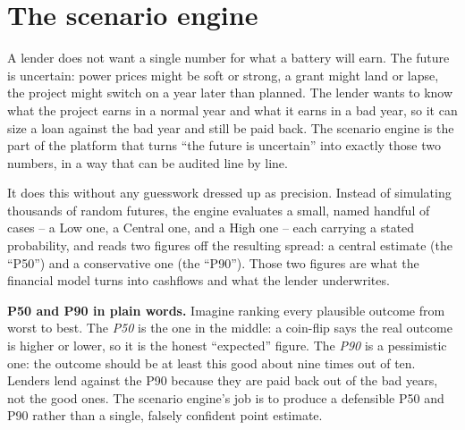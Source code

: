 \chapter{The scenario engine}
\label{ch:scenarios}

A lender does not want a single number for what a battery will earn. The future is uncertain: power prices might be soft or strong, a grant might land or lapse, the project might switch on a year later than planned. The lender wants to know what the project earns in a normal year and what it earns in a bad year, so it can size a loan against the bad year and still be paid back. The scenario engine is the part of the platform that turns ``the future is uncertain'' into exactly those two numbers, in a way that can be audited line by line.

It does this without any guesswork dressed up as precision. Instead of simulating thousands of random futures, the engine evaluates a small, named handful of cases -- a Low one, a Central one, and a High one -- each carrying a stated probability, and reads two figures off the resulting spread: a central estimate (the ``P50'') and a conservative one (the ``P90''). Those two figures are what the financial model turns into cashflows and what the lender underwrites.

\begin{plainnote}
\textbf{P50 and P90 in plain words.} Imagine ranking every plausible outcome from worst to best. The \emph{P50} is the one in the middle: a coin-flip says the real outcome is higher or lower, so it is the honest ``expected'' figure. The \emph{P90} is a pessimistic one: the outcome should be at least this good about nine times out of ten. Lenders lend against the P90 because they are paid back out of the bad years, not the good ones. The scenario engine's job is to produce a defensible P50 and P90 rather than a single, falsely confident point estimate.
\end{plainnote}


